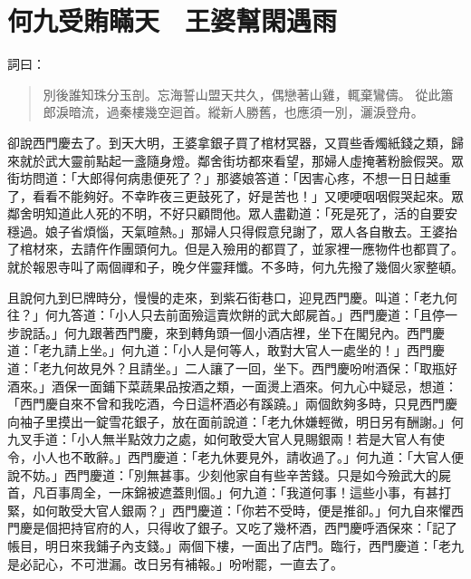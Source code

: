 
\chapter{何九受賄瞞天　王婆幫閑遇雨}

詞曰：
\begin{quote}
別後誰知珠分玉剖。忘海誓山盟天共久，偶戀著山雞，輒棄鸞儔。
從此簫郎淚暗流，過秦樓幾空迴首。縱新人勝舊，也應須一別，灑淚登舟。
\end{quote}

卻說西門慶去了。到天大明，王婆拿銀子買了棺材冥器，又買些香燭紙錢之類，歸來就於武大靈前點起一盞隨身燈。鄰舍街坊都來看望，那婦人虛掩著粉臉假哭。眾街坊問道：「大郎得何病患便死了？」那婆娘答道：「因害心疼，不想一日日越重了，看看不能夠好。不幸昨夜三更鼓死了，好是苦也！」又哽哽咽咽假哭起來。眾鄰舍明知道此人死的不明，不好只顧問他。眾人盡勸道：「死是死了，活的自要安穩過。娘子省煩惱，天氣暄熱。」那婦人只得假意兒謝了，眾人各自散去。王婆抬了棺材來，去請仵作團頭何九。但是入殮用的都買了，並家裡一應物件也都買了。就於報恩寺叫了兩個禪和子，晚夕伴靈拜懺。不多時，何九先撥了幾個火家整頓。

且說何九到巳牌時分，慢慢的走來，到紫石街巷口，迎見西門慶。叫道：「老九何往？」何九答道：「小人只去前面殮這賣炊餅的武大郎屍首。」西門慶道：「且停一步說話。」何九跟著西門慶，來到轉角頭一個小酒店裡，坐下在閣兒內。西門慶道：「老九請上坐。」何九道：「小人是何等人，敢對大官人一處坐的！」西門慶道：「老九何故見外？且請坐。」二人讓了一回，坐下。西門慶吩咐酒保：「取瓶好酒來。」酒保一面鋪下菜蔬果品按酒之類，一面燙上酒來。何九心中疑忌，想道：「西門慶自來不曾和我吃酒，今日這杯酒必有蹊蹺。」兩個飲夠多時，只見西門慶向袖子里摸出一錠雪花銀子，放在面前說道：「老九休嫌輕微，明日另有酬謝。」何九叉手道：「小人無半點效力之處，如何敢受大官人見賜銀兩！若是大官人有使令，小人也不敢辭。」西門慶道：「老九休要見外，請收過了。」何九道：「大官人便說不妨。」西門慶道：「別無甚事。少刻他家自有些辛苦錢。只是如今殮武大的屍首，凡百事周全，一床錦被遮蓋則個。」何九道：「我道何事！這些小事，有甚打緊，如何敢受大官人銀兩？」西門慶道：「你若不受時，便是推卻。」何九自來懼西門慶是個把持官府的人，只得收了銀子。又吃了幾杯酒，西門慶呼酒保來：「記了帳目，明日來我鋪子內支錢。」兩個下樓，一面出了店門。臨行，西門慶道：「老九是必記心，不可泄漏。改日另有補報。」吩咐罷，一直去了。

